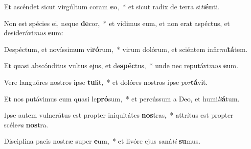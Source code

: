 \item Et ascéndet sicut virgúltum coram \textbf{e}o,~* et sicut radix de terra si\textit{ti}\textbf{én}ti.
\item Non est spécies ei, neque \textbf{de}cor,~* et vídimus eum, et non erat aspéctus, et desiderávi\textit{mus} \textbf{e}um:
\item Despéctum, et novíssimum vi\textbf{ró}rum,~* virum dolórum, et sciéntem infir\textit{mi}\textbf{tá}tem.
\item Et quasi abscónditus vultus ejus, et de\textbf{spéc}tus,~* unde nec reputávi\textit{mus} \textbf{e}um.
\item Vere languóres nostros ipse \textbf{tu}lit,~* et dolóres nostros ipse \textit{por}\textbf{tá}vit.
\item Et nos putávimus eum quasi le\textbf{pró}sum,~* et percússum a Deo, et humi\textit{li}\textbf{á}tum.
\item Ipse autem vulnerátus est propter iniquitátes \textbf{nos}tras,~* attrítus est propter scéle\textit{ra} \textbf{nos}tra.
\item Disciplína pacis nostræ super \textbf{e}um,~* et livóre ejus saná\textit{ti} \textbf{su}mus.
